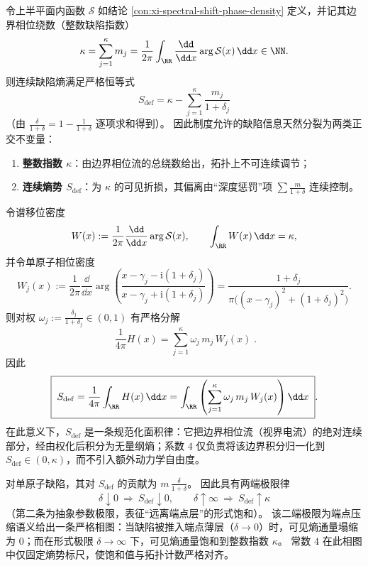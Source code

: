 \begin{proposition}\label{con:xi-index-entropy-strict-separation}
令上半平面内函数 \(\mathcal{S}\) 如结论 \ref{con:xi-spectral-shift-phase-density} 定义，并记其边界相位绕数（整数缺陷指数）
\[
\kappa=\sum_{j=1}^{\kappa}m_j
=\frac{1}{2\pi}\int_{\RR}\frac{\dd}{\dd x}\arg \mathcal{S}(x)\,\dd x\in\NN.
\]
则连续缺陷熵满足严格恒等式
\[
\boxed{\;
S_{\mathrm{def}}
=\kappa-\sum_{j=1}^{\kappa}\frac{m_j}{1+\delta_j}\;}
\]
（由 \( \frac{\delta}{1+\delta}=1-\frac{1}{1+\delta}\) 逐项求和得到）。
因此制度允许的缺陷信息天然分裂为两类正交不变量：
\begin{enumerate}
  \item \textbf{整数指数 \(\kappa\)}：由边界相位流的总绕数给出，拓扑上不可连续调节；
  \item \textbf{连续熵势 \(S_{\mathrm{def}}\)}：为 \(\kappa\) 的可见折损，其偏离由“深度惩罚”项 \(\sum \frac{m}{1+\delta}\) 连续控制。
\end{enumerate}
\end{proposition}

\begin{proposition}\label{con:xi-sdef-as-weighted-spectral-shift-area}
令谱移位密度
\[
W(x):=\frac{1}{2\pi}\frac{\dd}{\dd x}\arg \mathcal{S}(x),
\qquad \int_{\RR}W(x)\,\dd x=\kappa,
\]
并令单原子相位密度
\[
W_j(x):=\frac{1}{2\pi}\frac{\dd}{\dd x}\arg\!\left(\frac{x-\gamma_j-\mathrm{i}(1+\delta_j)}{x-\gamma_j+\mathrm{i}(1+\delta_j)}\right)
=\frac{1+\delta_j}{\pi\bigl((x-\gamma_j)^2+(1+\delta_j)^2\bigr)}.
\]
则对权 \(\omega_j:=\frac{\delta_j}{1+\delta_j}\in(0,1)\) 有严格分解
\[
\boxed{\;
\frac{1}{4\pi}H(x)=\sum_{j=1}^{\kappa}\omega_j\,m_j\,W_j(x)\; }.
\]
因此
\[
\boxed{\;
S_{\mathrm{def}}
=\frac{1}{4\pi}\int_{\RR}H(x)\,\dd x
=\int_{\RR}\left(\sum_{j=1}^{\kappa}\omega_j\,m_j\,W_j(x)\right)\dd x\; }.
\]
在此意义下，\(S_{\mathrm{def}}\) 是一条规范化面积律：它把边界相位流（视界电流）的绝对连续部分，经由权化后积分为无量纲熵；系数 \(4\) 仅负责将该边界积分归一化到 \(S_{\mathrm{def}}\in(0,\kappa)\)，而不引入额外动力学自由度。
\end{proposition}

\begin{proposition}\label{con:xi-sdef-collapse-saturation-phase}
对单原子缺陷，其对 \(S_{\mathrm{def}}\) 的贡献为 \(m\,\frac{\delta}{1+\delta}\)。
因此具有两端极限律
\[
\boxed{\;
\delta\downarrow 0\ \Longrightarrow\ S_{\mathrm{def}}\downarrow 0,
\qquad
\delta\uparrow\infty\ \Longrightarrow\ S_{\mathrm{def}}\uparrow \kappa\;}
\]
（第二条为抽象参数极限，表征“远离端点层”的形式饱和）。
该二端极限为端点压缩语义给出一条严格相图：当缺陷被推入端点薄层（\(\delta\to 0\)）时，可见熵通量塌缩为 \(0\)；而在形式极限 \(\delta\to\infty\) 下，可见熵通量饱和到整数指数 \(\kappa\)。
常数 \(4\) 在此相图中仅固定熵势标尺，使饱和值与拓扑计数严格对齐。
\end{proposition}

